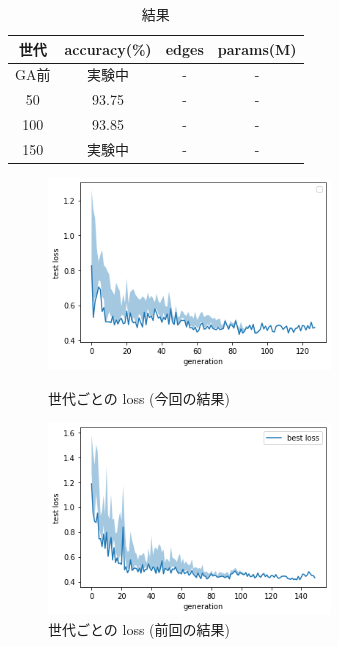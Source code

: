 \documentclass[twocolumn]{jarticle}     %
\begin{document}
\begin{table}[tb]
  \begin{center}
    \caption{結果}
    \begin{tabular}{|c|c|c|c|} \hline
      世代 & accuracy(\%) & edges & params(M) \\ \hline\hline
      GA前 & 実験中 & - & - \\ \hline\hline
      50 & 93.75 & - & - \\ \hline
      100 & 93.85 & - & - \\ \hline
      150 & 実験中 & - & - \\ \hline
    \end{tabular}
    \label{tab:result_ga}
  \end{center}
\end{table}


\begin{figure}[tb]
 \begin{minipage}{0.5\hsize}
 	\begin{center}
    \includegraphics[clip,width=75mm]{loss.png}
    \caption{世代ごとの loss (今回の結果)}
    \label{fig:loss}
 	\end{center}
 \end{minipage}
 \begin{minipage}{0.5\hsize}
 	\begin{center}
    \includegraphics[clip,width=75mm]{loss_before.png}
    \caption{世代ごとの loss (前回の結果)}
    \label{fig:loss2}
 	\end{center}
 \end{minipage}
\end{figure}
\end{document}
